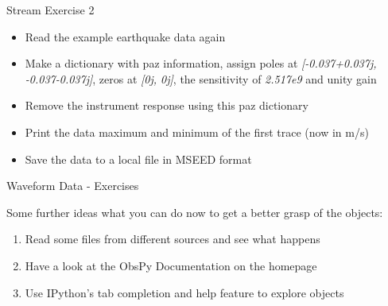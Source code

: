 \begin{frame}{Stream Exercise 2}
    \begin{itemize}
        \item Read the example earthquake data again
        \item Make a dictionary with paz information, assign poles at \textit{[-0.037+0.037j, -0.037-0.037j]}, zeros at \textit{[0j, 0j]}, the sensitivity of \textit{2.517e9} and unity gain
        \item Remove the instrument response using this paz dictionary
        \item Print the data maximum and minimum of the first trace (now in m/s)
        \item Save the data to a local file in MSEED format
    \end{itemize}
\end{frame}


\begin{frame}{Waveform Data - Exercises}

    Some further ideas what you can do now to get a better grasp of the objects:

    \begin{enumerate}
        \item Read some files from different sources and see what happens
        \item Have a look at the ObsPy Documentation on the homepage
        \item Use IPython's tab completion and help feature to explore objects
    \end{enumerate}


\end{frame}




